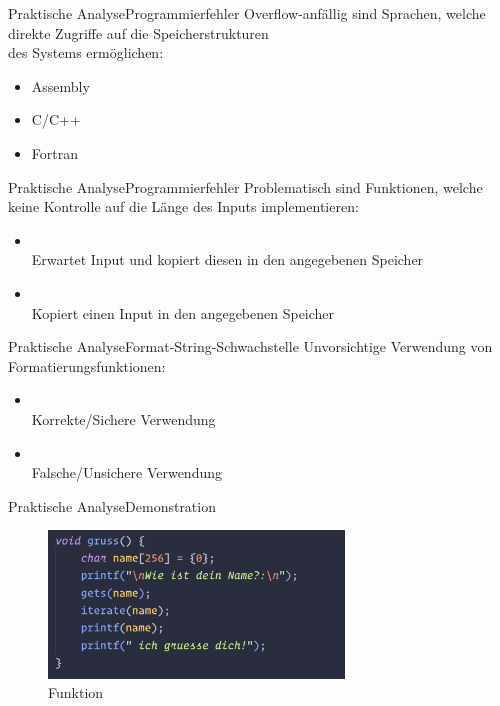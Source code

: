 \begin{frame}{Praktische Analyse}{Programmierfehler}
    Overflow-anfällig sind Sprachen, welche direkte Zugriffe auf die Speicherstrukturen\\ des Systems ermöglichen:
    \begin{itemize}
        \vspace{1em}
        \item Assembly
        \item C/C++
        \item Fortran
    \end{itemize}
\end{frame}

\begin{frame}{Praktische Analyse}{Programmierfehler}
    Problematisch sind Funktionen, welche
    keine Kontrolle auf die Länge des Inputs implementieren: %
    \begin{itemize}
        \vspace{1em}
        \item {}\\ Erwartet Input und kopiert diesen in den angegebenen Speicher
        \vspace{1em}
        \item {}\\ Kopiert einen Input
        in den angegebenen Speicher
    \end{itemize}
\end{frame}


\begin{frame}{Praktische Analyse}{Format-String-Schwachstelle}
    Unvorsichtige Verwendung von Formatierungsfunktionen:
    \begin{itemize}
        \vspace{1em}
        \item {}\\ Korrekte/Sichere Verwendung
        \vspace{1em}
        \item {}\\ Falsche/Unsichere Verwendung
    \end{itemize}
\end{frame}

\begin{frame}{Praktische Analyse}{Demonstration}
    \begin{figure}[h]
        \centering
        \includegraphics[width=0.7\textwidth,height=0.75\textheight,keepaspectratio]{images/gruss.png}
        \caption{Funktion  }
    \end{figure}
\end{frame}

